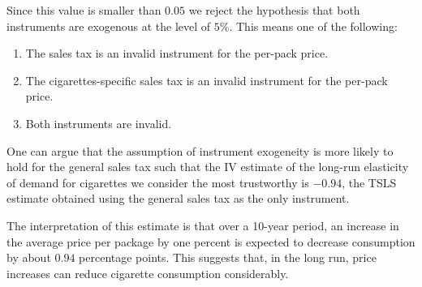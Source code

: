 \documentclass[
  14pt,
]{memoir}
\providecommand{\tightlist}{%
  \setlength{\itemsep}{0pt}\setlength{\parskip}{0pt}}
\begin{document}
Since this value is smaller than \(0.05\) we reject the hypothesis that both instruments are exogenous at the level of \(5\%\). This means one of the following:

\begin{enumerate}
\def\labelenumi{\arabic{enumi}.}
\tightlist
\item
  The sales tax is an invalid instrument for the per-pack price.
\item
  The cigarettes-specific sales tax is an invalid instrument for the per-pack price.
\item
  Both instruments are invalid.
\end{enumerate}

One can argue that the assumption of instrument exogeneity is more likely to hold for the general sales tax such that the IV estimate of the long-run elasticity of demand for cigarettes we consider the most trustworthy is \(-0.94\), the TSLS estimate obtained using the general sales tax as the only instrument.

The interpretation of this estimate is that over a 10-year period, an increase in the average price per package by one percent is expected to decrease consumption by about \(0.94\) percentage points. This suggests that, in the long run, price increases can reduce cigarette consumption considerably.

  
\end{document}
